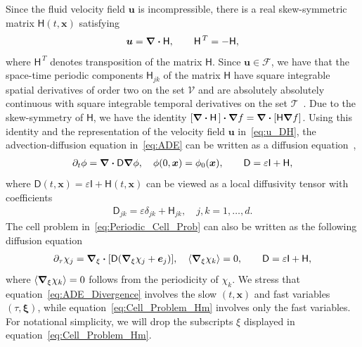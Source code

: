 \documentclass[leqno,onefignum,onetabnum]{siamltex1213}
\newcommand{\Tc}{\mathcal{T}}
\newcommand{\Vc}{\mathcal{V}}
\newcommand{\Fc}{\mathcal{F}}
\newcommand{\Dm}{\mathsf{D}}
\newcommand{\Hm}{\mathsf{H}}
\newcommand{\Ib}{\mathsf{I}}
\newcommand\bnabla{\mbox{\boldmath${\nabla}$}}
\providecommand\bcdot{\boldsymbol{\cdot}}
\newcommand{\vecx}{\boldsymbol{x}}
\newcommand{\vecu}{\boldsymbol{u}}
\newcommand{\vece}{\boldsymbol{e}}
\newcommand{\vecxi}{\boldsymbol{\xi}}
\begin{document}
Since the fluid velocity field $\vecu$ is incompressible, there is a
real skew-symmetric matrix $\Hm(t,\vecx)$
satisfying~\cite{Avellaneda:PRL-753,Avellaneda:CMP-339}   
% 
\begin{align}\label{eq:u_DH}
 \vecu =\bnabla \bcdot\Hm, \qquad   \Hm^{\,T}=-\Hm,
\end{align}
% 
where $\Hm^{\,T}$ denotes transposition of the matrix $\Hm$. Since
$\vecu\in\Fc$, we have that the space-time periodic components
$\Hm_{jk}$ of the matrix $\Hm$ have square integrable spatial
derivatives of order two on the set $\Vc$ and are absolutely
absolutely continuous with square integrable temporal derivatives on
the set $\Tc$~\cite{Bhattacharya:AAP:1999:951}. Due to 
the skew-symmetry of $\Hm$, we have the identity
$[\bnabla\bcdot\Hm\,]\bcdot\bnabla f=\bnabla\bcdot[\Hm\bnabla f]$. Using
this identity and the representation of the velocity field $\vecu$
in~\eqref{eq:u_DH}, the advection-diffusion equation in~\eqref{eq:ADE}
can be written as a diffusion
equation~\cite{Fannjiang:1994:SIAM_JAM:333},    
%
\begin{align}\label{eq:ADE_Divergence}
  \partial_t\phi%
    =\bnabla \bcdot\Dm\bnabla \phi, \quad
    \phi(0,\vecx)=\phi_0(\vecx),
    \qquad
    \Dm=\varepsilon\Ib+\Hm,
\end{align}
%
where $\Dm(t,\vecx)=\varepsilon\Ib+\Hm(t,\vecx)$ can be viewed as a local
diffusivity tensor with coefficients
%
\begin{align}\label{eq:kappa_coeff}
  \Dm_{jk}=\varepsilon\delta_{jk}+\Hm_{jk},\quad j,k=1,\ldots,d.
\end{align}
%
The cell problem in~\eqref{eq:Periodic_Cell_Prob} can also be
written as the following diffusion
equation~\cite{Fannjiang:1994:SIAM_JAM:333}     
% 
\begin{align}\label{eq:Cell_Problem_Hm}
  \partial_\tau\chi_j=\bnabla_\xi \bcdot[\Dm(\bnabla_\xi \chi_j+\vece_j)],
  \quad
  \langle\bnabla_\xi \chi_k\rangle=0, \qquad
  \Dm=\varepsilon\Ib+\Hm,
\end{align}
%
where $\langle\bnabla_\xi \chi_k\rangle=0$ follows from the periodicity of $\chi_k$. We
stress that equation~\eqref{eq:ADE_Divergence} involves the slow
$(t,\vecx)$ and fast variables $(\tau,\vecxi)$, while
equation~\eqref{eq:Cell_Problem_Hm} involves only the fast variables. 
For notational simplicity, we will drop the subscripts $\xi$ displayed
in equation~\eqref{eq:Cell_Problem_Hm}. 
\end{document}
